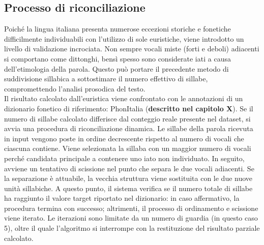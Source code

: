 \subsection{Processo di riconciliazione}
Poiché la lingua italiana presenta numerose eccezioni storiche e fonetiche difficilmente individuabili con l'utilizzo di sole euristiche, 
viene introdotto un livello di validazione incrociata. Non sempre vocali miste (forti e deboli) adiacenti si comportano come dittonghi, bensì spesso 
sono considerate iati a causa dell'etimologia della parola. Questo può portare il precedente metodo 
di suddivisione sillabica a sottostimare il numero effettivo di sillabe, compromettendo l'analisi prosodica del testo.\\  
Il risultato calcolato dall'euristica viene confrontato con le annotazioni di un dizionario fonetico di riferimento: PhonItalia 
(\textbf{descritto nel capitolo X}). 
Se il numero di sillabe calcolato differisce dal conteggio reale presente nel dataset, si avvia una procedura di riconciliazione dinamica.
Le sillabe della parola ricevuta in input vengono poste in ordine decrescente rispetto al numero di vocali che ciascuna contiene. Viene selezionata 
la sillaba con un maggior numero di vocali perché candidata principale a contenere uno iato non individuato. In seguito, avviene un tentativo di scissione 
nel punto che separa le due vocali adiacenti. Se la separazione è attuabile, la vecchia struttura viene sostituita con le due nuove unità sillabiche. 
A questo punto, il sistema verifica se il numero totale di sillabe ha raggiunto il valore target riportato nel dizionario: in caso affermativo, la procedura 
termina con successo; altrimenti, il processo di ordinamento e scissione viene iterato. Le iterazioni sono limitate da un numero di guardia (in questo caso 5), 
oltre il quale l'algoritmo si interrompe con la restituzione del risultato parziale calcolato.

